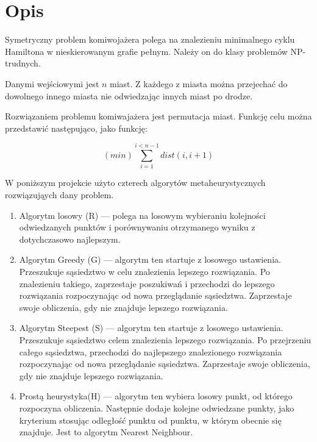 \section{Opis}

Symetryczny problem komiwojażera polega na znalezieniu minimalnego cyklu Hamiltona
w nieskierowanym grafie pełnym. Należy on do klasy problemów NP-trudnych. 

Danymi wejściowymi jest $ n $ miast. Z każdego z miasta można przejechać do dowolnego
innego miasta nie odwiedzając innych miast po drodze.

Rozwiązaniem problemu komiwajażera jest permutacja miast. Funkcję celu można przedstawić
następująco, jako funkcję:

$$ (min) \sum_{i=1}^{i < n - 1} dist(i, i+1) $$

W poniższym projekcie użyto czterech algorytów metaheurystycznych rozwiązująych 
dany problem. 

\begin{enumerate}

\item Algorytm losowy (R) --- polega na losowym wybieraniu kolejności odwiedzanych punktów i 
porównywaniu otrzymanego wyniku z dotychczasowo najlepszym.

\item Algorytm Greedy (G) --- algorytm ten startuje z losowego ustawienia. Przeszukuje 
sąsiedztwo w celu znalezienia lepszego rozwiązania. Po znalezieniu takiego, zaprzestaje 
poszukiwań i przechodzi do lepszego rozwiązania rozpoczynając od nowa przeglądanie sąsiedztwa.
Zaprzestaje swoje obliczenia, gdy nie znajduje lepszego rozwiązania.

\item Algorytm Steepest (S) --- algorytm ten startuje z losowego ustawienia. Przeszukuje 
sąsiedztwo celem znalezienia lepszego rozwiązania. Po przejrzeniu całego sąsiedztwa, przechodzi 
do najlepszego znalezionego rozwiązania rozpoczynając od nowa przeglądanie sąsiedztwa.
Zaprzestaje swoje obliczenia, gdy nie znajduje lepszego rozwiązania.

\item Prostą heurystyka(H) --- algorytm ten wybiera losowy punkt, od którego rozpoczyna obliczenia.
Następnie dodaje kolejne odwiedzane punkty, jako kryterium stosując odległość punktu od punktu, w 
którym obecnie się znajduje. Jest to algorytm Nearest Neighbour.

\end{enumerate}

